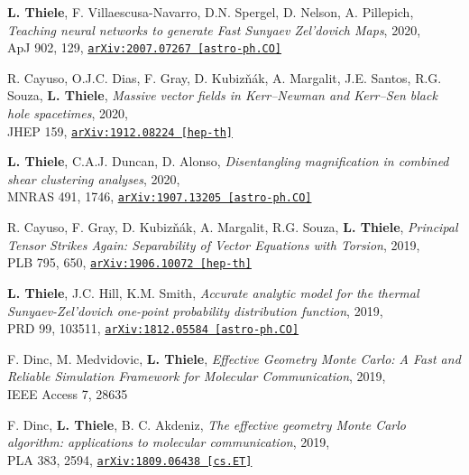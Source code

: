 {\bf L. Thiele}, F. Villaescusa-Navarro, D.N. Spergel, D. Nelson, A. Pillepich,
\emph{Teaching neural networks to generate Fast Sunyaev Zel'dovich Maps}, 2020,\\
ApJ 902, 129,
\href{https://arxiv.org/abs/2007.07267}{\mbox{\texttt{arXiv:2007.07267 [astro-ph.CO]}}}

R. Cayuso, O.J.C. Dias, F. Gray, D. Kubiz\v{n}\'{a}k, A. Margalit, J.E. Santos,
R.G. Souza, {\bf L. Thiele},
\emph{Massive vector fields in Kerr--Newman and Kerr--Sen black hole spacetimes}, 2020,\\
JHEP 159,
\href{https://arxiv.org/abs/1912.08224}{\mbox{\texttt{arXiv:1912.08224 [hep-th]}}}

{\bf L. Thiele}, C.A.J. Duncan, D. Alonso,
\emph{Disentangling magnification in combined shear clustering analyses}, 2020,\\
MNRAS 491, 1746,
\href{https://arxiv.org/abs/1907.13205}{\mbox{\texttt{arXiv:1907.13205 [astro-ph.CO]}}}

\newpage
\vspace*{0.5cm}

R. Cayuso, F. Gray, D. Kubiz\v{n}\'{a}k, A. Margalit, R.G. Souza, {\bf L. Thiele},
\emph{Principal Tensor Strikes Again: Separability of Vector Equations with Torsion}, 2019,\\
PLB 795, 650,
\href{https://arxiv.org/abs/1906.10072}{\mbox{\texttt{arXiv:1906.10072 [hep-th]}}}

{\bf L. Thiele}, J.C. Hill, K.M. Smith, \emph{Accurate analytic model for the thermal
Sunyaev-Zel'dovich one-point probability distribution function}, 2019,\\
PRD 99, 103511,
\href{https://arxiv.org/abs/1812.05584}{\mbox{\texttt{arXiv:1812.05584 [astro-ph.CO]}}}

F. Dinc, M. Medvidovic, {\bf L. Thiele}, \emph{Effective Geometry Monte Carlo: A Fast and
Reliable Simulation Framework for Molecular Communication}, 2019,\\
IEEE Access 7, 28635

F. Dinc, {\bf L. Thiele}, B. C. Akdeniz, \emph{The effective geometry Monte Carlo
algorithm: applications to molecular communication}, 2019,\\
PLA 383, 2594,
\href{https://arxiv.org/abs/1809.06438}{\mbox{\texttt{arXiv:1809.06438 [cs.ET]}}}
